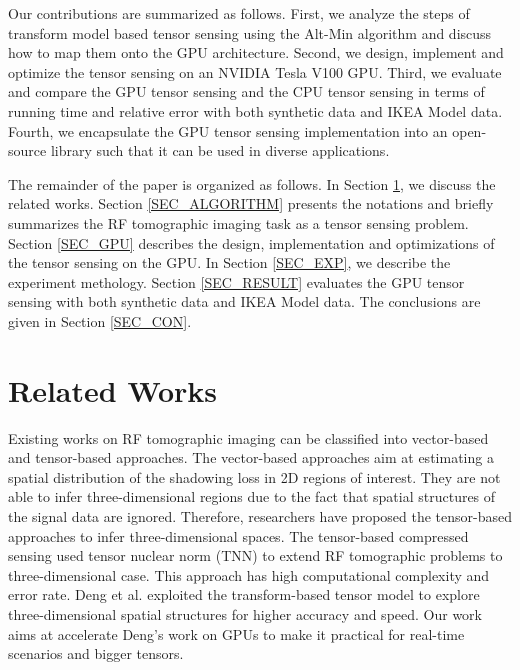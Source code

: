 \documentclass[futureinternet,article,submit,moreauthors,pdftex,10pt,a4paper]{Definitions/mdpi}
\theoremstyle{plain}
\theoremstyle{definition}
\theoremstyle{remark}
\begin{document}
Our contributions are summarized as follows. First, we analyze the steps of transform model based tensor sensing using the Alt-Min algorithm and discuss how to map them onto the GPU architecture. Second, we design, implement and optimize the tensor sensing on an NVIDIA Tesla V100 GPU. Third, we evaluate and compare the GPU tensor sensing and the CPU tensor sensing in terms of running time and relative error with both synthetic data and IKEA Model data. Fourth, we encapsulate the GPU tensor sensing implementation into an open-source library such that it can be used in diverse applications.

The remainder of the paper is organized as follows. In Section \ref{SEC_RW}, we discuss the related works. Section \ref{SEC_ALGORITHM} presents the notations and briefly summarizes the RF tomographic imaging task as a tensor sensing problem. Section \ref{SEC_GPU} describes the design, implementation and optimizations of the tensor sensing on the GPU. In Section \ref{SEC_EXP}, we describe the experiment methology. Section \ref{SEC_RESULT} evaluates the GPU tensor sensing with both synthetic data and IKEA Model data. The conclusions are given in Section \ref{SEC_CON}.

\section{Related Works}
\label{SEC_RW}
Existing works on RF tomographic imaging can be classified into vector-based and tensor-based approaches. The vector-based approaches \cite{kanso2009compressed} \cite{mostofi2011compressive} aim at estimating a spatial distribution of the shadowing loss in 2D regions of interest. They are not able to infer three-dimensional regions due to the fact that spatial structures of the signal data are ignored. Therefore, researchers have proposed the tensor-based approaches \cite{matsuda2017multi} \cite{deng2018tensor} to infer  three-dimensional spaces. The tensor-based compressed sensing \cite{matsuda2017multi} used tensor nuclear norm (TNN) \cite{li2013generalized} to extend RF tomographic problems to three-dimensional case. This approach has high computational complexity and error rate. Deng et al. \cite{deng2018tensor} exploited the transform-based tensor model \cite{liu2017fourth} to explore three-dimensional spatial structures for higher accuracy and speed. Our work aims at accelerate Deng's work on GPUs to make it practical for real-time scenarios and bigger tensors.
\end{document}
